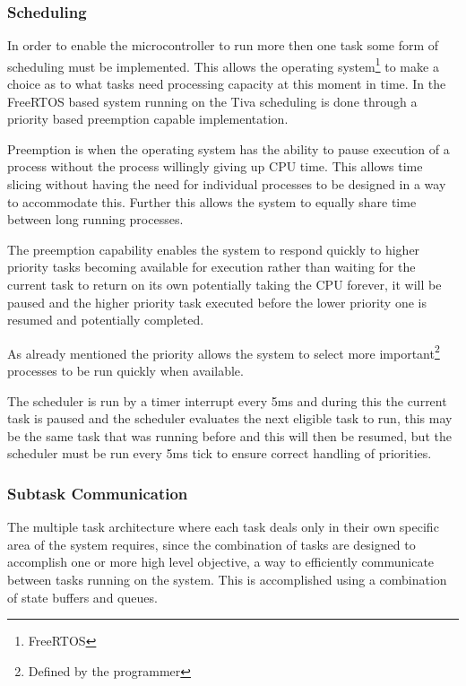 \documentclass[../../../main]{subfiles}
\begin{document}
\subsubsection{Scheduling}

In order to enable the microcontroller to run more then one task some form of scheduling must be implemented. This allows the operating system\footnote{FreeRTOS} to make a choice as to what tasks need processing capacity at this moment in time. In the FreeRTOS based system running on the Tiva scheduling is done through a priority based preemption capable implementation.

Preemption is when the operating system has the ability to pause execution of a process without the process willingly giving up CPU time. This allows time slicing without having the need for individual processes to be designed in a way to accommodate this. Further this allows the system to equally share time between long running processes.

The preemption capability enables the system to respond quickly to higher priority tasks becoming available for execution rather than waiting for the current task to return on its own potentially taking the CPU forever, it will be paused and the higher priority task executed before the lower priority one is resumed and potentially completed. 

As already mentioned the priority allows the system to select more important\footnote{Defined by the programmer} processes to be run quickly when available. 

The scheduler is run by a timer interrupt every 5ms and during this the current task is paused and the scheduler evaluates the next eligible task to run, this may be the same task that was running before and this will then be resumed, but the scheduler must be run every 5ms tick to ensure correct handling of priorities.

\subsubsection{Subtask Communication}

The multiple task architecture where  each task deals only in their own specific area of the system requires, since the combination of tasks are designed to accomplish one or more high level objective, a way to efficiently communicate between tasks running on the system.
This is accomplished using a combination of state buffers and queues.
\end{document}
